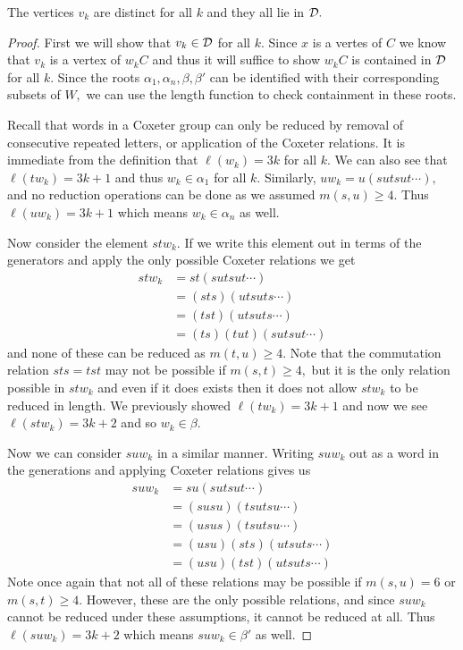 \documentclass[class=book, crop=false,12 pt]{standalone}
\begin{document}
\begin{lemma}
	\label{infmany}
	The vertices $v_k$ are distinct for all $k$ and they all lie in $\mathcal{D}.$
\end{lemma}
\begin{proof}
	First we will show that $v_k\in \mathcal{D}$ for all $k.$ Since $x$ is a vertes of $C$ we know that $v_k$ is a vertex of $w_kC$ and thus it will suffice to show $w_kC$ is contained in $\mathcal{D}$ for all $k.$ Since the roots $\alpha_1,\alpha_n,\beta,\beta'$ can be identified with their corresponding subsets of $W,$ we can use the length function to check containment in these roots.

	Recall that words in a Coxeter group can only be reduced by removal of consecutive repeated letters, or application of the Coxeter relations. It is immediate from the definition that $\ell(w_k)=3k$ for all $k.$ We can also see that $\ell(tw_k)=3k+1$ and thus $w_k\in \alpha_1$ for all $k.$ Similarly, $uw_k=u(sutsut\cdots),$ and no reduction operations can be done as we assumed $m(s,u)\ge 4.$ Thus $\ell(uw_k)=3k+1$ which means $w_k\in \alpha_n$ as well.

	Now consider the element $stw_k.$ If we write this element out in terms of the generators and apply the only possible Coxeter relations we get
	\begin{align*}
		stw_k&=st(sutsut\cdots)\\
		     &=(sts)(utsuts\cdots)\\
		     &=(tst)(utsuts\cdots)\\
		     &=(ts)(tut)(sutsut\cdots)
	\end{align*}
	and none of these can be reduced as $m(t,u)\ge 4.$ Note that the commutation relation $sts=tst$ may not be possible if $m(s,t)\ge 4,$ but it is the only relation possible in $stw_k$ and even if it does exists then it does not allow $stw_k$ to be reduced in length. We previously showed $\ell(tw_k)=3k+1$ and now we see $\ell(stw_k)=3k+2$ and so $w_k\in \beta.$

	Now we can consider $suw_k$ in a similar manner. Writing $suw_k$ out as a word in the generations and applying Coxeter relations gives us
\begin{align*}
	suw_k&=su(sutsut\cdots)\\
	     &=(susu)(tsutsu\cdots)\\
	     &=(usus)(tsutsu\cdots)\\
	     &=(usu)(sts)(utsuts\cdots)\\
	     &=(usu)(tst)(utsuts\cdots)
\end{align*}
Note once again that not all of these relations may be possible if $m(s,u)=6$ or $m(s,t)\ge 4.$ However, these are the only possible relations, and since $suw_k$ cannot be reduced under these assumptions, it cannot be reduced at all. Thus $\ell(suw_k)=3k+2$ which means $suw_k\in \beta'$ as well.


\end{proof}
\end{document}

